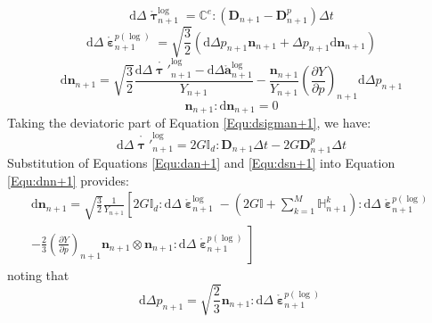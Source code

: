 \begin{equation}
\label{Equ:dsigman+1}
{\text{d}}\Delta \mathring {\bm{\uptau}}_{n + 1}^{\log } = {\mathbb{C}^e}:\left( \mathbf{D}_{n+1} - \mathbf{D}_{n+1}^{p} \right) \Delta t
\end{equation}
\begin{equation}
\label{Equ:depsilon+1}
{\text{d}}\Delta \mathring {\bm{\upepsilon}}_{n + 1}^{p(\log) } = \sqrt {\frac{3}{2}} \left( {{\text{d}}\Delta {p_{n + 1}}{{\mathbf{n}}_{n + 1}} + \Delta {p_{n + 1}}{\text{d}}{{\mathbf{n}}_{n + 1}}} \right)
\end{equation}
\begin{equation}
\label{Equ:dnn+1}
{\text{d}}{{\mathbf{n}}_{n + 1}} = \sqrt {\frac{3}{2}} \frac{{{\text{d}}\Delta \mathring {{\bm{\uptau}}'}_{n + 1}^{\log } - {\text{d}}\Delta \mathring {\mathbf{a}}_{n + 1}^{\log } }}{{{Y_{n + 1}}}} - \frac{{{{\mathbf{n}}_{n + 1}}}}{{{Y_{n + 1}}}}{\left( {\frac{{\partial Y}}{{\partial p}}} \right)_{n + 1}}{\text{d}}\Delta {p_{n + 1}}
\end{equation}
\begin{equation}
{{\mathbf{n}}_{n + 1}}:{\text{d}}{{\mathbf{n}}_{n + 1}} = 0
\end{equation}
Taking the deviatoric part of Equation \ref{Equ:dsigman+1}, we have:
\begin{equation}
\label{Equ:dsn+1}
{\text{d}}\Delta \mathring {{\bm{\uptau}}'}_{n + 1}^{\log }  = 2G{\mathbb{I}_d}:\mathbf{D}_{n+1} \Delta t - 2G\mathbf{D}_{n+1}^p \Delta t
\end{equation}
Substitution of Equations \ref{Equ:dan+1} and \ref{Equ:dsn+1} into Equation \ref{Equ:dnn+1} provides:
\begin{equation}
\label{Equ:dnn+12}
\begin{aligned}
{\text{d}}{{\mathbf{n}}_{n + 1}} = \sqrt {\frac{3}{2}} \frac{1}{{{Y_{n + 1}}}} \left[ {2G{\mathbb{I}_d}:{\text{d}}\Delta \mathring {\bm{\upepsilon}}_{n + 1}^{\log } - \left( {2G\mathbb{I} + \sum\limits_{k = 1}^M {\mathbb{H}_{n + 1}^k} } \right):{\text{d}}\Delta \mathring {\bm{\upepsilon}}_{n + 1}^{p(\log) } } \right.\\
\left. { - \frac{2}{3}{{\left( {\frac{{\partial Y}}{{\partial p}}} \right)}_{n + 1}}{{\mathbf{n}}_{n + 1}} \otimes {{\mathbf{n}}_{n + 1}}:{\text{d}}\Delta \mathring {\bm{\upepsilon}}_{n + 1}^{p(\log) }}\right]
\end{aligned}
\end{equation}
noting that
\begin{equation}
\label{Equ:dpn+1}
{\text{d}}\Delta {p_{n + 1}} = \sqrt {\frac{2}{3}} {{\mathbf{n}}_{n + 1}}:{\text{d}}\Delta \mathring {\bm{\upepsilon}}_{n + 1}^{p(\log) }
\end{equation}
